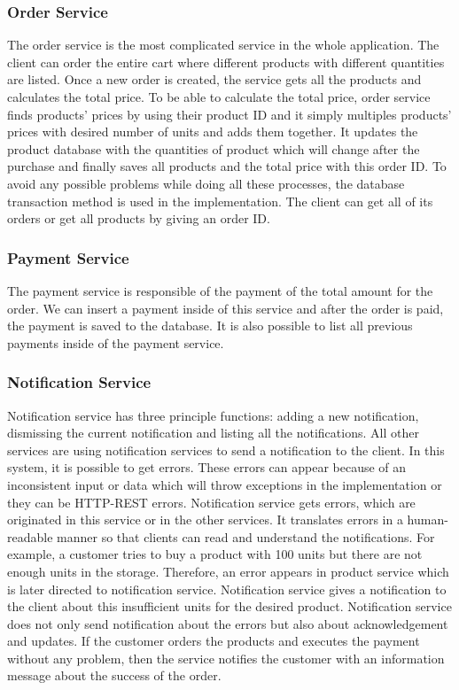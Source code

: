 \documentclass{article}
\begin{document}
\subsubsection{Order Service}
The order service is the most complicated service in the whole application. The client can order the entire cart where different products with different quantities are listed. Once a new order is created, the service gets all the products and calculates the total price. To be able to calculate the total price, order service finds products’ prices by using their product ID and it simply multiples products’ prices with desired number of units and adds them together. It updates the product database with the quantities of product which will change after the purchase and finally saves all products and the total price with this order ID. To avoid any possible problems while doing all these processes, the database transaction method is used in the implementation. The client can get all of its orders or get all products by giving an order ID. 

\subsubsection{Payment Service}
The payment service is responsible of the payment of the total amount for the order. We can insert a payment inside of this service and after the order is paid, the payment is saved to the database. It is also possible to list all previous payments inside of the payment service.

\subsubsection{Notification Service}
Notification service has three principle functions: adding a new notification, dismissing the current notification and listing all the notifications. All other services are using notification services to send a notification to the client. In this system, it is possible to get errors. These errors can appear because of an inconsistent input or data which will throw exceptions in the implementation or they can be HTTP-REST errors. Notification service gets errors, which are originated in this service or in the other services. It translates errors in a human-readable manner so that clients can read and understand the notifications.
\linebreak 
\linebreak
For example,  a customer tries to buy a product with 100 units but there are not enough units in the storage. Therefore, an error appears in product service which is later directed to notification service. Notification service gives a notification to the client about this insufficient units for the desired product. Notification service does not only send notification about the errors but also about acknowledgement and updates. If the customer orders the products and executes the payment without any problem, then the service notifies the customer with an information message about the success of the order.
\end{document}
